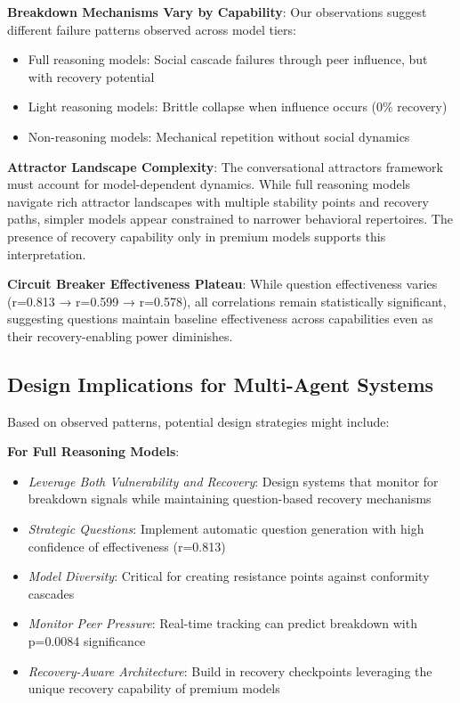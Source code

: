 \documentclass[11pt,letterpaper]{article}
\newcommand{\exponedataQuestionCorrelation}{0.813}
\newcommand{\exponedataPeerPressureANOVAPValue}{p=0.0084}
\newcommand{\exptwoQuestionCorrelation}{0.599}
\newcommand{\expthreeQuestionCorrelation}{0.578}
\begin{document}
\textbf{Breakdown Mechanisms Vary by Capability}: Our observations suggest different failure patterns observed across model tiers:
\begin{itemize}
    \item Full reasoning models: Social cascade failures through peer influence, but with recovery potential
    \item Light reasoning models: Brittle collapse when influence occurs (0\% recovery)
    \item Non-reasoning models: Mechanical repetition without social dynamics
\end{itemize}

\textbf{Attractor Landscape Complexity}: The conversational attractors framework must account for model-dependent dynamics. While full reasoning models navigate rich attractor landscapes with multiple stability points and recovery paths, simpler models appear constrained to narrower behavioral repertoires. The presence of recovery capability only in premium models supports this interpretation.

\textbf{Circuit Breaker Effectiveness Plateau}: While question effectiveness varies (r=\exponedataQuestionCorrelation{} → r=\exptwoQuestionCorrelation{} → r=\expthreeQuestionCorrelation{}), all correlations remain statistically significant, suggesting questions maintain baseline effectiveness across capabilities even as their recovery-enabling power diminishes.

\subsection{Design Implications for Multi-Agent Systems}

Based on observed patterns, potential design strategies might include:

\textbf{For Full Reasoning Models}:
\begin{itemize}
    \item \textit{Leverage Both Vulnerability and Recovery}: Design systems that monitor for breakdown signals while maintaining question-based recovery mechanisms
    \item \textit{Strategic Questions}: Implement automatic question generation with high confidence of effectiveness (r=\exponedataQuestionCorrelation{})
    \item \textit{Model Diversity}: Critical for creating resistance points against conformity cascades
    \item \textit{Monitor Peer Pressure}: Real-time tracking can predict breakdown with \exponedataPeerPressureANOVAPValue{} significance
    \item \textit{Recovery-Aware Architecture}: Build in recovery checkpoints leveraging the unique recovery capability of premium models
\end{itemize}
\end{document}
